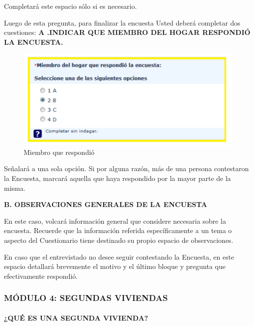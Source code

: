 \documentclass[
  openany]{book}
\begin{document}
Completará este espacio sólo si es necesario.

Luego de esta pregunta, para finalizar la encuesta Usted deberá completar dos cuestiones: \textbf{A .INDICAR QUE MIEMBRO DEL HOGAR RESPONDIÓ LA ENCUESTA.}

\begin{figure}

{\centering \includegraphics[width=1\linewidth]{imagenes/figura6-64} 

}

\caption{Miembro que respondió}\label{fig:respues9}
\end{figure}

Señalará a una sola opción. Si por alguna razón, más de una persona contestaron la Encuesta, marcará aquella que haya respondido por la mayor parte de la misma.

\textbf{B. OBSERVACIONES GENERALES DE LA ENCUESTA}

En este caso, volcará información general que considere necesaria sobre la encuesta. Recuerde que la información referida específicamente a un tema o aspecto del Cuestionario tiene destinado su propio espacio de observaciones.

En caso que el entrevistado no desee seguir contestando la Encuesta, en este espacio detallará brevemente el motivo y el último bloque y pregunta que efectivamente respondió.

\hypertarget{muxf3dulo-4-segundas-viviendas}{%
\subsubsection{\texorpdfstring{\textbf{MÓDULO 4: SEGUNDAS VIVIENDAS}}{MÓDULO 4: SEGUNDAS VIVIENDAS}}\label{muxf3dulo-4-segundas-viviendas}}

\hypertarget{quuxe9-es-una-segunda-vivienda}{%
\paragraph{\texorpdfstring{\textbf{¿QUÉ ES UNA SEGUNDA VIVIENDA?}}{¿QUÉ ES UNA SEGUNDA VIVIENDA?}}\label{quuxe9-es-una-segunda-vivienda}}
\end{document}
